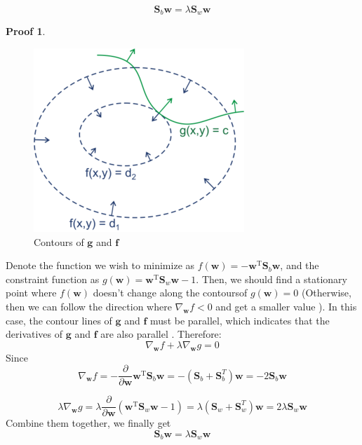 \documentclass[a4paper,UTF8]{article}
\numberwithin{equation}{section}
\theoremstyle{definition}
\newtheorem*{prove}{Proof}
\begin{document}
\begin{equation}
\label{dual}
\mathbf{S}_b\mathbf{w} = \lambda \mathbf{S}_w\mathbf{w}
\end{equation}
\begin{prove}

\begin{figure}[h]{}
\centering 
\includegraphics[scale=0.6]{Images/1.png}
\caption{Contours of $\mathbf{g}$ and $\mathbf{f}$}
\end{figure} 
Denote the function we wish to minimize as $f(\mathbf{w}) = -\mathbf{w}^\mathrm{T} \mathbf{S}_b\mathbf{w}$, and the constraint function as  $g(\mathbf{w}) =  \mathbf{w}^\mathrm{T} \mathbf{S}_w\mathbf{w} - 1 $. 
Then, we should find a stationary point where $f(\mathbf{w}) $ doesn't change along the contours\footnotemark  of $g(\mathbf{w}) = 0$ (Otherwise, then we can follow the direction where $\nabla_{\mathbf{w}}f < 0 $ and get a smaller value ).   In this case, the contour lines of $\mathbf{g}$ and $\mathbf{f}$ must be parallel, which indicates that the derivatives of $\mathbf{g}$ and $\mathbf{f}$ are also parallel \footnotemark.  Therefore: 
\begin{equation}
\nabla_{\mathbf{w}} f + \lambda \nabla_{ \mathbf{w}} g = 0
\end{equation}
Since 
\begin{equation}
 \nabla_{\mathbf{w}} f = - \frac{ \partial}{\partial\mathbf{w} }\mathbf{w}^\mathrm{T} \mathbf{S}_b\mathbf{w}  = - (\mathbf{S}_b + \mathbf{S}_b^T) \mathbf{w} = -2 \mathbf{S}_b \mathbf{w} 
 \end{equation}
 
 \begin{equation}
 \lambda \nabla_{ \mathbf{w}} g = \lambda \frac{ \partial}{\partial\mathbf{w} }  (  \mathbf{w}^\mathrm{T} \mathbf{S}_w\mathbf{w} - 1) =\lambda (\mathbf{S}_w+ \mathbf{S}_w^T) \mathbf{w} = 2  \lambda\mathbf{S}_w \mathbf{w}
 \end{equation}
Combine them together, we finally get 
  \begin{equation}
  \mathbf{S}_b\mathbf{w} = \lambda \mathbf{S}_w\mathbf{w}
   \end{equation}


\end{prove}
\end{document}
